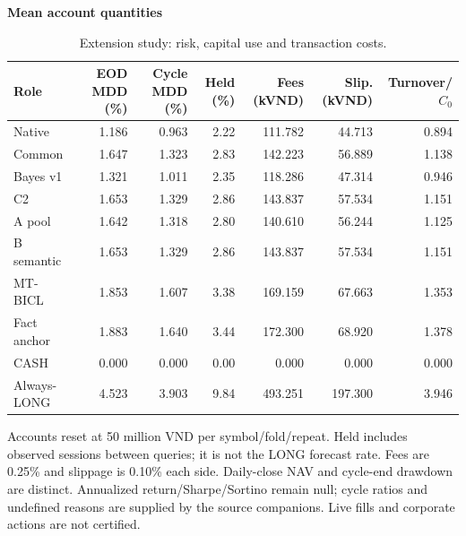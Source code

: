 \begin{table}[!htb]
\centering\small
\setlength{\tabcolsep}{3pt}
\renewcommand{\arraystretch}{1.12}
\caption{Extension study: risk, capital use and transaction costs.}
\label{tab:u09-economics}
\textbf{Mean account quantities}\par\smallskip
\begin{tabular}{lrrrrrr}
\hline
Role & EOD MDD (\%) & Cycle MDD (\%) & Held (\%) & Fees (kVND) & Slip. (kVND) & Turnover/$C_0$ \\
\hline
Native & 1.186 & 0.963 & 2.22 & 111.782 & 44.713 & 0.894 \\
Common & 1.647 & 1.323 & 2.83 & 142.223 & 56.889 & 1.138 \\
Bayes v1 & 1.321 & 1.011 & 2.35 & 118.286 & 47.314 & 0.946 \\
C2 & 1.653 & 1.329 & 2.86 & 143.837 & 57.534 & 1.151 \\
A pool & 1.642 & 1.318 & 2.80 & 140.610 & 56.244 & 1.125 \\
B semantic & 1.653 & 1.329 & 2.86 & 143.837 & 57.534 & 1.151 \\
MT-BICL & 1.853 & 1.607 & 3.38 & 169.159 & 67.663 & 1.353 \\
Fact anchor & 1.883 & 1.640 & 3.44 & 172.300 & 68.920 & 1.378 \\
CASH & 0.000 & 0.000 & 0.00 & 0.000 & 0.000 & 0.000 \\
Always-LONG & 4.523 & 3.903 & 9.84 & 493.251 & 197.300 & 3.946 \\
\hline
\end{tabular}\par\medskip
\begin{minipage}{\textwidth}\footnotesize Accounts reset at 50 million VND per symbol/fold/repeat. Held includes observed sessions between queries; it is not the LONG forecast rate. Fees are 0.25\% and slippage is 0.10\% each side. Daily-close NAV and cycle-end drawdown are distinct. Annualized return/Sharpe/Sortino remain null; cycle ratios and undefined reasons are supplied by the source companions. Live fills and corporate actions are not certified.\end{minipage}
\end{table}
